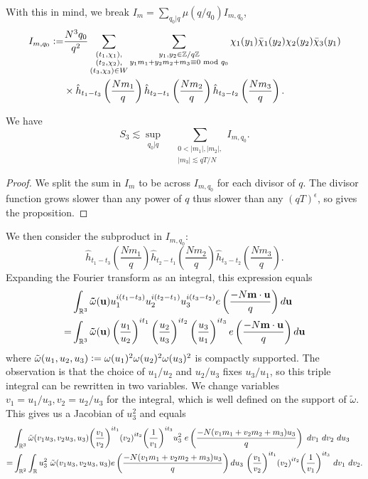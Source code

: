 With this in mind, we break $I_m=\sum_{q_0|q}\mu(q/q_0)I_{m,q_0}$,\begin{align*}
	I_{m,q_0}\mathrel{\mathop:}=&\frac{N^3q_0}{q^2}\sum_{\substack{(t_1,\chi_1),\\(t_2,\chi_2),\\(t_3,\chi_3)\in W}} \sum_{\substack{y_1,y_2 \in\mathbb{Z}/q\mathbb{Z} \\ y_1m_1+y_2m_2+m_3\equiv 0 \textrm{ mod } q_0}}\chi_1(y_1)\bar{\chi}_1(y_2)\chi_2(y_2)\bar{\chi}_3(y_1)\\
	&\times \hat{h}_{t_1-t_3}\left(\frac{Nm_1}{q}\right)\hat{h}_{t_2-t_1}\left(\frac{Nm_2}{q}\right)\hat{h}_{t_3-t_2}\left(\frac{Nm_3}{q}\right).
\end{align*}
\begin{proposition}  \label{divisorreduction}We have\[
	S_3 \lesssim \sup_{q_0|q}\quad \sum_{\substack{0<|m_1|,|m_2|,\\|m_3|\lesssim qT/N}} I_{m,q_0}.
	\]
\end{proposition}
\begin{proof}
	We split the sum in $I_m$ to be across $I_{m,q_0}$ for each divisor of $q$. The divisor function grows slower than any power of $q$ thus slower than any $(qT)^{\epsilon}$, so gives the proposition.
\end{proof}
We then consider the subproduct in $I_{m,q_0}$: \[
\hat{h}_{t_1-t_3}\left(\frac{Nm_1}{q}\right)\hat{h}_{t_2-t_1}\left(\frac{Nm_2}{q}\right)\hat{h}_{t_3-t_2}\left(\frac{Nm_3}{q}\right).
\]
Expanding the Fourier transform as an integral, this expression equals \begin{align*}
	&\int_{\mathbb{R}^3}\mathbf{\tilde{\omega}}(\mathbf{u})u_1^{i(t_1-t_3)}u_2^{i(t_2-t_1)}u_3^{i(t_3-t_2)}e\left(\frac{-N\mathbf{m}\cdot \mathbf{u}}{q}\right)d\mathbf{u}\\
	=&\int_{\mathbb{R}^3}\mathbf{\tilde{\omega}}(\mathbf{u})\left(\frac{u_1}{u_2}\right)^{it_1}\left(\frac{u_2}{u_3}\right)^{it_2}\left(\frac{u_3}{u_1}\right)^{it_3}
	e\left(\frac{-N\mathbf{m}\cdot \mathbf{u}}{q}\right)d\mathbf{u}
\end{align*}
where $\tilde{\omega}(u_1,u_2,u_3)\mathrel{\mathop:}= \omega(u_1)^2\omega(u_2)^2\omega(u_3)^2$ is compactly supported. The observation is that the choice of $u_1/u_2$ and $u_2/u_3$ fixes $u_3/u_1$, so this triple integral can be rewritten in two variables. We change variables $v_1=u_1/u_3,v_2=u_2/u_3$ for the integral, which is well defined on the support of $\tilde{\omega}$. This gives us a Jacobian of $u_3^2$ and equals
\begin{equation}\label{im1integral}
	\begin{split}
		&\int_{\reals^3}\tilde{\omega}(v_1u_3,v_2u_3,u_3) {\left(\frac{v_1}{v_2}\right)}^{it_1} {\left(v_2\right)}^{it_2}{\left(\frac{1}{v_1}\right)}^{it_3} u_3^2 \ e\left(\frac{-N(v_1m_1+v_2m_2+m_3)u_3}{q}\right)\ dv_1\ dv_2\ du_3\\
		=&\int_{\reals^2}\int_\reals u_3^2 \ \tilde{\omega}(v_1u_3,v_2u_3,u_3) e\left(\frac{-N(v_1m_1+v_2m_2+m_3)u_3}{q}\right)  du_3 \ {\left(\frac{v_1}{v_2}\right)}^{it_1} {\left(v_2\right)}^{it_2}{\left(\frac{1}{v_1}\right)}^{it_3}  \ dv_1\ dv_2.\\
	\end{split}
\end{equation}
